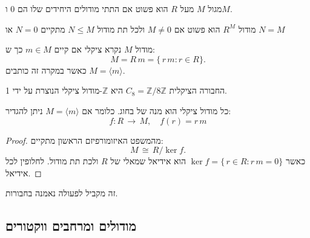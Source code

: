 \documentclass{tstextbook}
\begin{document}
\begin{definition}
מגול \(M\) מעל \(R\) הוא פשוט אם התתי מודולים היחידים שלו הם 0 ו\(M\).

\end{definition}
\begin{proposition}
מודול \(R^{M}\) הוא פשוט אם \(M\neq 0\) ולכל תת מודול \(N\leq M\) מתקיים \(N=0\) או \(N=M\)

\end{proposition}
\begin{definition}
מודול \(M\) נקרא ציקלי אם קיים \(m \in M\) כך ש:
$$M=R\,m=\{\,r\,m:r\in R\}.$$
כאשר במקרה זה כותבים \(M=\langle m \rangle\).

\end{definition}
\begin{example}
החבורה הציקלית \(C_{8}= \mathbb{Z} / 8\mathbb{Z}\) היא \(\mathbb{Z}\)-מודול ציקלי הנוצרת על ידי 1.

\end{example}
\begin{proposition}
כל מודול ציקלי הוא מנה של בחוג. כלומר אם \(M=\langle m \rangle\) ניתן להגדיר:
$$f:R\,\longrightarrow\,M,\quad f(r)=r\,m$$

\end{proposition}
\begin{proof}
מהמשפט האיזומורפיזם הראשון מתקיים:
$$M\,\cong\,R/\ker f.$$
כאשר \(\ker f=\{\,r\in R:r\,m=0\}\) הוא אידיאל שמאלי של \(R\) ולכת תת מודול. לחלופין לכל אידיאל.

\end{proof}
\begin{remark}
זה מקביל לפעולה נאמנה בחבורות.

\end{remark}
\subsection{מודולים ומרחבים ווקטורים}
\end{document}
